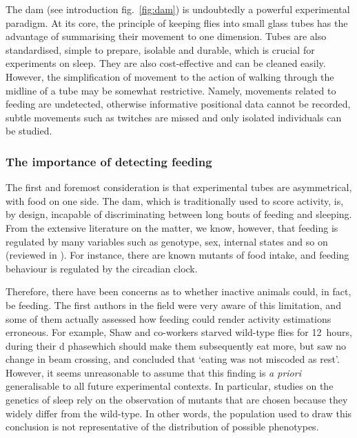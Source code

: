 The \gls{dam} (see introduction fig.~\ref{fig:dam}) is undoubtedly a powerful experimental paradigm.
At its core, the principle of keeping flies into small glass tubes has the advantage of summarising their movement to one dimension.
Tubes are also standardised, simple to prepare, isolable and durable, 
which is crucial for experiments on sleep.
They are also cost-effective and can be cleaned easily.
However, the simplification of movement to the action of walking through the midline of a tube may be somewhat restrictive.
Namely, movements related to feeding are undetected, 
otherwise informative positional data cannot be recorded,
subtle movements such as twitches are missed 
and only isolated individuals can be studied.

\subsubsection{The importance of detecting feeding}

The first and foremost consideration is that experimental tubes are asymmetrical, with food on one side. 
The \gls{dam}, which is traditionally used to score activity, is,  by design, incapable of discriminating between long bouts of feeding and sleeping.
From the extensive literature on the matter, we know, however, that feeding is regulated by many variables such as genotype, sex, internal states and so on (reviewed in \cite{xu_regulation_2008}). For instance, there are known mutants of food intake\cite{barnes_feeding_2008,meunier_regulation_2007}, and feeding behaviour is regulated by the circadian clock\cite{xu_regulation_2008}.

Therefore, there have been concerns as to whether inactive animals could, in fact, be feeding.
The first authors in the field were very aware of this limitation, and some of them actually assessed how feeding could render activity estimations erroneous.
For example, Shaw and co-workers starved wild-type flies for 12~hours, during their \gls{d} phase\emd{}which should make them subsequently eat more\emd{}, but saw no change in beam crossing, and concluded that `eating was not miscoded as rest'\cite[supplementary material]{shaw_correlates_2000}. 
However, it seems unreasonable to assume that this finding is \emph{a priori} generalisable to all future experimental contexts.
In particular, studies on the genetics of sleep rely on the observation of mutants that are chosen because they widely differ from the wild-type.
In other words, the population used to draw this conclusion is not representative of the distribution of possible phenotypes.

